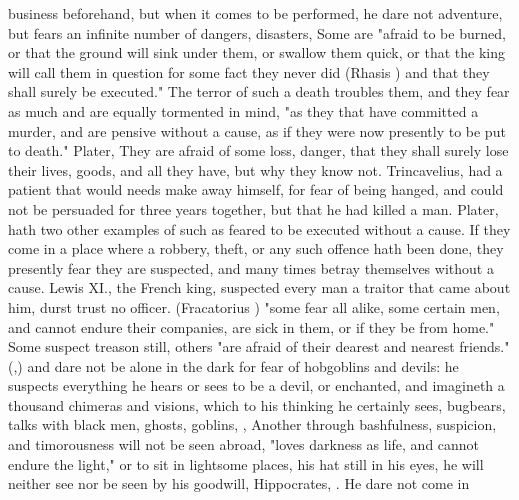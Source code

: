 {business beforehand, but when it comes to be performed, he dare not adventure,
but fears an infinite number of dangers, disasters, \etc{} Some are
"afraid to be burned, or that the
ground will sink under them, or
swallow them quick, or that the king will call them in
question for some fact they never did (Rhasis ) and
that they shall surely be executed." The terror of such a death troubles them,
and they fear as much and are equally tormented in mind,
"as they that have committed a murder, and are pensive
without a cause, as if they were now presently to be put to death." Plater,
 They are afraid of some loss,
danger, that they shall surely lose their lives, goods, and all they have, but
why they know not. Trincavelius,  had
a patient that would needs make away himself, for fear of being hanged, and
could not be persuaded for three years together, but that he had killed a man.
Plater,  hath two other examples of
such as feared to be executed without a cause. If they come in a place where a
robbery, theft, or any such offence hath been done, they presently fear they
are suspected, and many times betray themselves without a cause. Lewis XI., the
French king, suspected every man a traitor that came about him, durst trust no
officer.  (Fracatorius
) "some fear
all alike, some certain men, and cannot endure their companies, are sick in
them, or if they be from home." Some suspect treason
still, others "are afraid of their dearest and nearest
friends." (,) and dare not be alone in
the dark for fear of hobgoblins and devils: he suspects everything he hears or
sees to be a devil, or enchanted, and imagineth a thousand chimeras and
visions, which to his thinking he certainly sees, bugbears, talks with black
men, ghosts, goblins, \etc{},  Another through bashfulness, suspicion, and timorousness
will not be seen abroad, "loves darkness as life, and
cannot endure the light," or to sit in lightsome places, his hat still in his
eyes, he will neither see nor be seen by his goodwill, Hippocrates,
. He dare not come in
}
